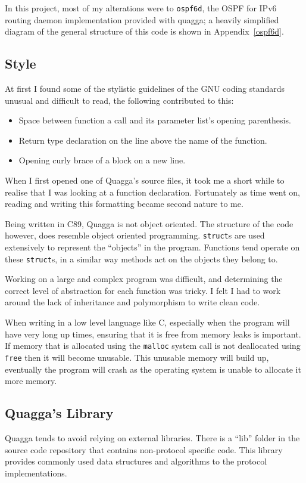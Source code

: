 In this project, most of my alterations were to \texttt{ospf6d}, the OSPF for
IPv6 routing daemon implementation provided with quagga; a heavily simplified
diagram of the general structure of this code is shown in
Appendix~\ref{ospf6d}.

\subsection{Style}
At first I found some of the stylistic guidelines of the GNU coding standards
unusual and difficult to read, the following contributed to this:
\begin{itemize} 
  \item Space between function a call and its parameter list's opening parenthesis.
  \item Return type declaration on the line above the name of the function.  
  \item Opening curly brace of a block on a new line.
\end{itemize}

When I first opened one of Quagga's source files, it took me a short while to
realise that I was looking at a function declaration. Fortunately as time went
on, reading and writing this formatting became second nature to me. 

Being written in C89, Quagga is not object oriented. The structure of the code
however, does resemble object oriented programming. \texttt{struct}s are used
extensively to represent the ``objects'' in the program. Functions tend operate
on these \texttt{struct}s, in a similar way methods act on the objects
they belong to.

Working on a large and complex program was difficult, and determining the
correct level of abstraction for each function was tricky.  I felt I had to
work around the lack of inheritance and polymorphism to write clean code. 

When writing in a low level language like C, especially when the program will
have very long up times, ensuring that it is free from memory leaks is
important. If memory that is allocated using the \texttt{malloc} system call is
not deallocated using \texttt{free} then it will become unusable. This unusable
memory will build up, eventually the program will crash as the operating system
is unable to allocate it more memory.

\subsection{Quagga's Library}
Quagga tends to avoid relying on external libraries. There is a ``lib'' folder
in the source code repository that contains non-protocol specific code. This
library provides commonly used data structures and algorithms to the protocol
implementations. 

